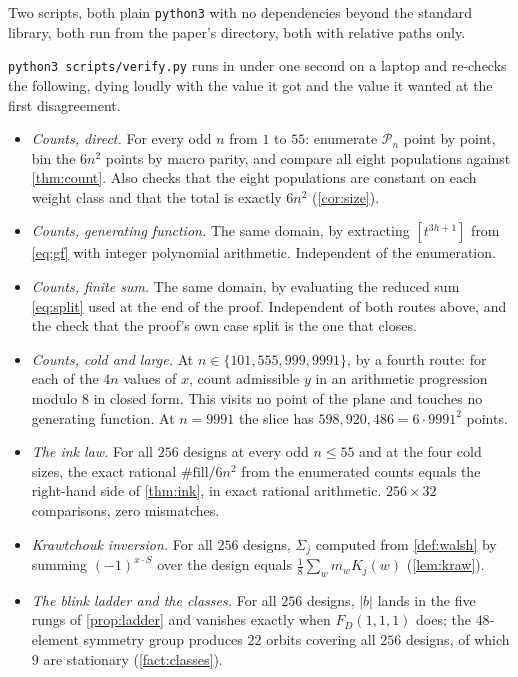 \documentclass[11pt]{amsart}
\theoremstyle{definition}
\theoremstyle{remark}
\begin{document}
Two scripts, both plain \texttt{python3} with no dependencies beyond the standard library, both run from the paper's directory, both with relative paths only.

\texttt{python3 scripts/verify.py} runs in under one second on a laptop and re-checks the following, dying loudly with the value it got and the value it wanted at the first disagreement.

\begin{itemize}
\item \emph{Counts, direct.} For every odd $n$ from $1$ to $55$: enumerate $\mathcal{P}_n$ point by point, bin the $6n^2$ points by macro parity, and compare all eight populations against \cref{thm:count}. Also checks that the eight populations are constant on each weight class and that the total is exactly $6n^2$ (\cref{cor:size}).
\item \emph{Counts, generating function.} The same domain, by extracting $[t^{3h+1}]$ from \cref{eq:gf} with integer polynomial arithmetic. Independent of the enumeration.
\item \emph{Counts, finite sum.} The same domain, by evaluating the reduced sum \cref{eq:split} used at the end of the proof. Independent of both routes above, and the check that the proof's own case split is the one that closes.
\item \emph{Counts, cold and large.} At $n \in \{101, 555, 999, 9991\}$, by a fourth route: for each of the $4n$ values of $x$, count admissible $y$ in an arithmetic progression modulo $8$ in closed form. This visits no point of the plane and touches no generating function. At $n = 9991$ the slice has $598{,}920{,}486 = 6 \cdot 9991^2$ points.
\item \emph{The ink law.} For all $256$ designs at every odd $n \le 55$ and at the four cold sizes, the exact rational $\#\mathrm{fill}/6n^2$ from the enumerated counts equals the right-hand side of \cref{thm:ink}, in exact rational arithmetic. $256 \times 32$ comparisons, zero mismatches.
\item \emph{Krawtchouk inversion.} For all $256$ designs, $\Sigma_j$ computed from \cref{def:walsh} by summing $(-1)^{x \cdot S}$ over the design equals $\tfrac18\sum_w m_w K_j(w)$ (\cref{lem:kraw}).
\item \emph{The blink ladder and the classes.} For all $256$ designs, $|b|$ lands in the five rungs of \cref{prop:ladder} and vanishes exactly when $F_D(1,1,1)$ does; the $48$-element symmetry group produces $22$ orbits covering all $256$ designs, of which $9$ are stationary (\cref{fact:classes}).

\end{itemize}
\end{document}
